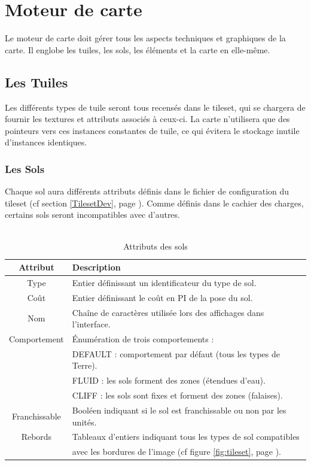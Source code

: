 \documentclass[a4paper]{memoir}
\begin{document}
		\section{Moteur de carte}
			Le moteur de carte doit gérer tous les aspects techniques et graphiques de la carte. Il englobe les tuiles, les sols, les éléments et la carte en elle-même.
			
			\subsection{Les Tuiles}
				Les différents types de tuile seront tous recensés dans le tileset, qui se chargera de fournir les textures et attributs associés à ceux-ci. La carte n'utilisera que des pointeurs vers ces instances constantes de tuile, ce qui évitera le stockage inutile d'instances identiques.
				
				\subsubsection{Les Sols}
					Chaque sol aura différents attributs définis dans le fichier de configuration du tileset (cf section \ref{TilesetDev}, page \pageref{TilesetDev}). Comme définis dans le cachier des charges, certains sols seront incompatibles avec d'autres.\\
					\\
					\begin{table}[H]
						\begin{small}
							\begin{tabular}{| c | l |}
								\hline
								\textbf{Attribut} & \textbf{Description}\\
								\hline
								Type & Entier définissant un identificateur du type de sol.\\
								\hline
								Coût & Entier définissant le coût en PI de la pose du sol.\\
								\hline
								Nom & Chaîne de caractères utilisée lors des affichages dans l'interface.\\
								\hline
								Comportement & \'Enumération de trois comportements :\\
								& DEFAULT : comportement par défaut (tous les types de Terre).\\
								& FLUID : les sols forment des zones (étendues d'eau).\\
								& CLIFF : les sols sont fixes et forment des zones (falaises).\\
								\hline
								Franchissable & Booléen indiquant si le sol est franchissable ou non par les unités.\\
								\hline
								Rebords & Tableaux d'entiers indiquant tous les types de sol compatibles\\
								& avec les bordures de l'image (cf figure \ref{fig:tileset}, page \pageref{fig:tileset}).\\
								\hline
							\end{tabular}
						\end{small}
						\label{tab:sol}
						\caption{Attributs des sols}
					\end{table}
					
\end{document}
